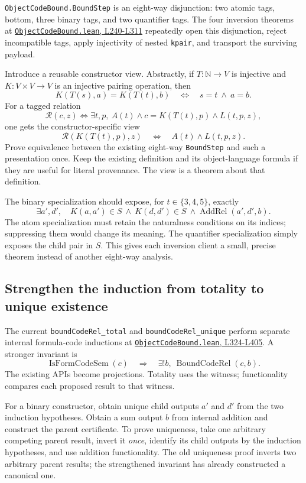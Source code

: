 \documentclass[11pt]{article}
\theoremstyle{remark}\newtheorem{remark}[theorem]{Remark}
\newcommand{\N}{\mathbb N}\newcommand{\Z}{\mathbb Z}
\newcommand{\code}[1]{\nolinkurl{#1}}
\newcommand{\sref}[2]{\href{https://github.com/VladimirReshetnikov/ProveIt/blob/8e8b5dcb954969621c484588f0b902be1cfea7b3/Computability/DiophantineConsistency/Lean/DiophantineConsistency/#1\##2}{\nolinkurl{#1}, #2}}
\begin{document}
\code{ObjectCodeBound.BoundStep} is an eight-way disjunction: two atomic tags, bottom, three binary tags, and two quantifier tags. The four inversion theorems at \sref{ObjectCodeBound.lean}{L240-L311} repeatedly open this disjunction, reject incompatible tags, apply injectivity of nested \code{kpair}, and transport the surviving payload.

Introduce a reusable constructor view. Abstractly, if \(T:\N\to V\) is injective and \(K:V\times V\to V\) is an injective pairing operation, then
\[
 K(T(s),a)=K(T(t),b)\quad\Longleftrightarrow\quad s=t\ \land\ a=b.
\]
For a tagged relation
\[
 \mathcal R(c,z)\iff
 \exists t,p,\ A(t)\land c=K(T(t),p)\land L(t,p,z),
\]
one gets the constructor-specific view
\[
 \mathcal R(K(T(t),p),z)\quad\Longleftrightarrow\quad A(t)\land L(t,p,z).
\]
Prove equivalence between the existing eight-way \code{BoundStep} and such a presentation once. Keep the existing definition and its object-language formula if they are useful for literal provenance. The view is a theorem about that definition.

The binary specialization should expose, for \(t\in\{3,4,5\}\), exactly
\[
 \exists a',d',\quad
 K(a,a')\in S\ \land\ K(d,d')\in S\ \land\operatorname{AddRel}(a',d',b).
\]
The atom specialization must retain the naturalness conditions on its indices; suppressing them would change its meaning. The quantifier specialization simply exposes the child pair in \(S\). This gives each inversion client a small, precise theorem instead of another eight-way analysis.

\subsection{Strengthen the induction from totality to unique existence}

The current \code{boundCodeRel_total} and \code{boundCodeRel_unique} perform separate internal formula-code inductions at \sref{ObjectCodeBound.lean}{L324-L405}. A stronger invariant is
\begin{equation}
 \operatorname{IsFormCodeSem}(c)
 \quad\Longrightarrow\quad
 \exists! b,\ \operatorname{BoundCodeRel}(c,b).
 \label{eq:uniqueexists}
\end{equation}
The existing APIs become projections. Totality uses the witness; functionality compares each proposed result to that witness.

For a binary constructor, obtain unique child outputs \(a'\) and \(d'\) from the two induction hypotheses. Obtain a sum output \(b\) from internal addition and construct the parent certificate. To prove uniqueness, take one arbitrary competing parent result, invert it \emph{once}, identify its child outputs by the induction hypotheses, and use addition functionality. The old uniqueness proof inverts two arbitrary parent results; the strengthened invariant has already constructed a canonical one.
\end{document}
